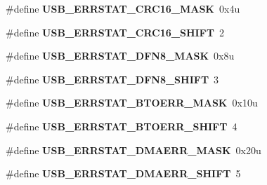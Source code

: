 \begin{DoxyCompactItemize}
\item 
\#define {\bfseries U\+S\+B\+\_\+\+E\+R\+R\+S\+T\+A\+T\+\_\+\+C\+R\+C16\+\_\+\+M\+A\+SK}~0x4u\hypertarget{group__USB__Register__Masks_gac9682448ca13abab007c9438e811610c}{}\label{group__USB__Register__Masks_gac9682448ca13abab007c9438e811610c}

\item 
\#define {\bfseries U\+S\+B\+\_\+\+E\+R\+R\+S\+T\+A\+T\+\_\+\+C\+R\+C16\+\_\+\+S\+H\+I\+FT}~2\hypertarget{group__USB__Register__Masks_gaf0bd8a085cd33bc98cf89d6ea726be46}{}\label{group__USB__Register__Masks_gaf0bd8a085cd33bc98cf89d6ea726be46}

\item 
\#define {\bfseries U\+S\+B\+\_\+\+E\+R\+R\+S\+T\+A\+T\+\_\+\+D\+F\+N8\+\_\+\+M\+A\+SK}~0x8u\hypertarget{group__USB__Register__Masks_gaf2aaf7552c127da34a4252936afe561a}{}\label{group__USB__Register__Masks_gaf2aaf7552c127da34a4252936afe561a}

\item 
\#define {\bfseries U\+S\+B\+\_\+\+E\+R\+R\+S\+T\+A\+T\+\_\+\+D\+F\+N8\+\_\+\+S\+H\+I\+FT}~3\hypertarget{group__USB__Register__Masks_gae26a3aed245ac0546edc65afaa2c5542}{}\label{group__USB__Register__Masks_gae26a3aed245ac0546edc65afaa2c5542}

\item 
\#define {\bfseries U\+S\+B\+\_\+\+E\+R\+R\+S\+T\+A\+T\+\_\+\+B\+T\+O\+E\+R\+R\+\_\+\+M\+A\+SK}~0x10u\hypertarget{group__USB__Register__Masks_ga64f9bd307b556ecbd454571aa2d1b4c8}{}\label{group__USB__Register__Masks_ga64f9bd307b556ecbd454571aa2d1b4c8}

\item 
\#define {\bfseries U\+S\+B\+\_\+\+E\+R\+R\+S\+T\+A\+T\+\_\+\+B\+T\+O\+E\+R\+R\+\_\+\+S\+H\+I\+FT}~4\hypertarget{group__USB__Register__Masks_gaa6f963350f684e982457839f7bc842e5}{}\label{group__USB__Register__Masks_gaa6f963350f684e982457839f7bc842e5}

\item 
\#define {\bfseries U\+S\+B\+\_\+\+E\+R\+R\+S\+T\+A\+T\+\_\+\+D\+M\+A\+E\+R\+R\+\_\+\+M\+A\+SK}~0x20u\hypertarget{group__USB__Register__Masks_ga3941bf3fbbca724b3b26a09bb2432581}{}\label{group__USB__Register__Masks_ga3941bf3fbbca724b3b26a09bb2432581}

\item 
\#define {\bfseries U\+S\+B\+\_\+\+E\+R\+R\+S\+T\+A\+T\+\_\+\+D\+M\+A\+E\+R\+R\+\_\+\+S\+H\+I\+FT}~5\hypertarget{group__USB__Register__Masks_ga2e3f280874ee203f1f801206ab4254be}{}\label{group__USB__Register__Masks_ga2e3f280874ee203f1f801206ab4254be}


\end{DoxyCompactItemize}
